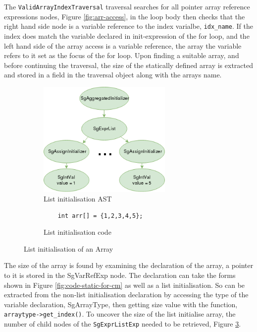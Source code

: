 \documentclass[bsc,frontabs,singlespacing,parskip,deptreport]{infthesis}
\begin{document}
The \texttt{ValidArrayIndexTraversal} traversal searches for all pointer array reference expressions nodes, Figure \ref{fig:arr-access}, in the loop body then checks that the right hand side node is a variable reference to the index varialbe, \texttt{idx\_name}. If the index does match the variable declared in init-expression of the for loop, and the left hand side of the array access is a variable reference, the array the variable refers to it set as the focus of the for loop. Upon finding a suitable array, and before continuing the traversal, the size of the statically defined array is extracted and stored in a field in the traversal object along with the arrays name. 

\begin{figure}[H]
    \begin{subfigure}[b]{0.5\textwidth}
        \centering
        \includegraphics[height=5.6cm]{images/init-list.png}
        \caption{List initialisation AST}
        \label{fig:list-init-AST}
    \end{subfigure}
    \hfill
    \begin{subfigure}[b]{0.5\textwidth}
        \centering
        \begin{verbatim}
    int arr[] = {1,2,3,4,5};
        \end{verbatim}
        \caption{List initialisation code}
        \label{fig:list-init-code}
    \end{subfigure}
    \vspace{-0.5cm}
    \caption{List initialisation of an Array}
    \label{fig:list-init}
\end{figure}

The size of the array is found by examining the declaration of the array, a pointer to it is stored in the SgVarRefExp node. The declaration can take the forms shown in Figure \ref{fig:code-static-for-cm} as well as a list initialisation. So  can be extracted from the non-list initialisation declaration by accessing the type of the variable declaration, SgArrayType, then getting size value with the function, \texttt{arraytype->get\_index()}. To uncover the size of the list initialise array, the number of child nodes of the \texttt{SgExprListExp} needed to be retrieved, Figure \ref{fig:list-init}. 
\end{document}
